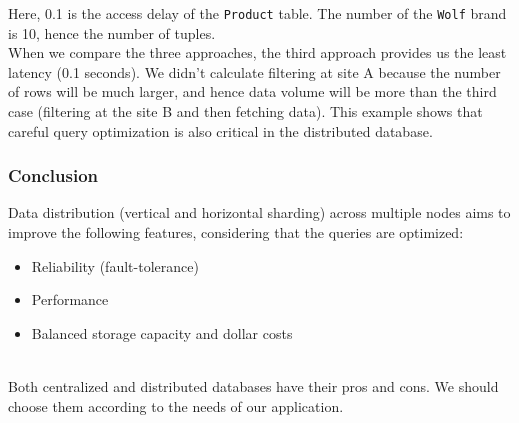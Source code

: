 Here, 0.1 is the access delay of the \texttt{Product} table. The number of the \texttt{Wolf} brand is 10, hence the number of tuples.
\\
When we compare the three approaches, the third approach provides us the least latency (0.1 seconds). We didn't calculate filtering at site A because the number of rows will be much larger, and hence data volume will be more than the third case (filtering at the site B and then fetching data). This example shows that careful query optimization is also critical in the distributed database.

\subsubsection{Conclusion}\label{qIrI4MHCx9k9slC4A72D5}

Data distribution (vertical and horizontal sharding) across multiple nodes aims to improve the following features, considering that the queries are optimized:

\begin{itemize}
\tightlist
\item
Reliability (fault-tolerance)
\item
Performance
\item
Balanced storage capacity and dollar costs
\end{itemize}
\\
Both centralized and distributed databases have their pros and cons. We should choose them according to the needs of our application.



